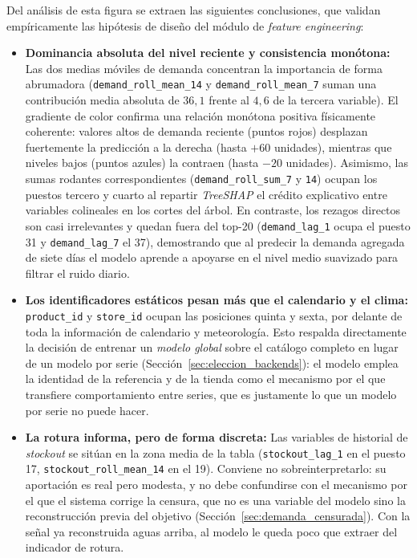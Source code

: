 Del análisis de esta figura se extraen las siguientes conclusiones, que validan empíricamente las hipótesis de diseño del módulo de \textit{feature engineering}:

\begin{itemize}
    \item \textbf{Dominancia absoluta del nivel reciente y consistencia monótona:} Las dos medias móviles de demanda concentran la importancia de forma abrumadora (\texttt{demand\_}\allowbreak\texttt{roll\_}\allowbreak\texttt{mean\_14} y \texttt{demand\_}\allowbreak\texttt{roll\_}\allowbreak\texttt{mean\_7} suman una contribución media absoluta de $36{,}1$ frente al $4{,}6$ de la tercera variable). El gradiente de color confirma una relación monótona positiva físicamente coherente: valores altos de demanda reciente (puntos rojos) desplazan fuertemente la predicción a la derecha (hasta $+60$ unidades), mientras que niveles bajos (puntos azules) la contraen (hasta $-20$ unidades). Asimismo, las sumas rodantes correspondientes (\texttt{demand\_roll\_sum\_7} y \texttt{14}) ocupan los puestos tercero y cuarto al repartir \textit{TreeSHAP} el crédito explicativo entre variables colineales en los cortes del árbol. En contraste, los rezagos directos son casi irrelevantes y quedan fuera del top-20 (\texttt{demand\_lag\_1} ocupa el puesto 31 y \texttt{demand\_lag\_7} el 37), demostrando que al predecir la demanda agregada de siete días el modelo aprende a apoyarse en el nivel medio suavizado para filtrar el ruido diario.
    \item \textbf{Los identificadores estáticos pesan más que el calendario y el clima:} \texttt{product\_id} y \texttt{store\_id} ocupan las posiciones quinta y sexta, por delante de toda la información de calendario y meteorología. Esto respalda directamente la decisión de entrenar un \emph{modelo global} sobre el catálogo completo en lugar de un modelo por serie (Sección~\ref{sec:eleccion_backends}): el modelo emplea la identidad de la referencia y de la tienda como el mecanismo por el que transfiere comportamiento entre series, que es justamente lo que un modelo por serie no puede hacer.
    \item \textbf{La rotura informa, pero de forma discreta:} Las variables de historial de \textit{stockout} se sitúan en la zona media de la tabla (\texttt{stockout\_lag\_1} en el puesto 17, \texttt{stockout\_}\allowbreak\texttt{roll\_}\allowbreak\texttt{mean\_14} en el 19). Conviene no sobreinterpretarlo: su aportación es real pero modesta, y no debe confundirse con el mecanismo por el que el sistema corrige la censura, que no es una variable del modelo sino la reconstrucción previa del objetivo (Sección~\ref{sec:demanda_censurada}). Con la señal ya reconstruida aguas arriba, al modelo le queda poco que extraer del indicador de rotura.

\end{itemize}
